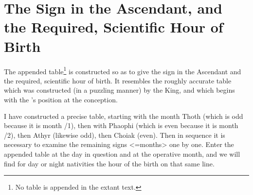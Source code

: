 \section{The Sign in the Ascendant, and the Required, Scientific Hour of Birth}

The appended table\footnote{No table is appended in the extant text.} is constructed so as to give the sign in the Ascendant and the required, scientific hour of birth. It resembles the roughly accurate table which was constructed (in a puzzling manner) by the King, and which begins with the \Sun’s position at the conception. 

I have constructed a precise table, starting with the month Thoth (which is odd because it is month /1), then with Phaophi (which is even because it is month /2), then Athyr (likewise odd), then Choiak (even). Then in sequence it is necessary to examine the remaining signs <=months> one by one. Enter the appended table at the day in question and at the operative month, and we will find for day or night nativities the hour of the birth on that same line.

\newpage